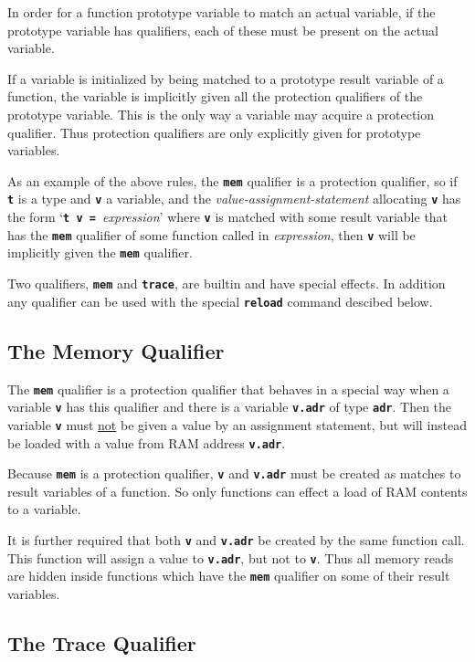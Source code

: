 \documentclass[12pt]{article}
\makeatletter
\newcommand{\TT}[1]{{\tt \bfseries #1}}
\newcommand{\ttkey}[1]{\TT{#1}\index{#1@{\tt #1}}}
\makeatother
\begin{document}
In order for a function
prototype variable to match an actual variable, if the prototype
variable has qualifiers, each of these must be present on the
actual variable.

If a variable is initialized by being matched to a prototype result variable
of a function, the variable is implicitly given all the protection qualifiers
of the prototype variable.  This is the only way a variable may acquire
a protection qualifier.  Thus protection qualifiers are only explicitly
given for prototype variables.

As an example of the above rules, the \TT{mem} qualifier is
a protection qualifier, so if \TT{t} is a type and \TT{v} a
variable, and the {\em value-assignment-statement} allocating \TT{v} has the
form `\TT{t v = }{\em expression}' where \TT{v} is matched
with some result variable that has the \TT{mem} qualifier of some
function called in {\em expression}, then \TT{v} will be implicitly
given the \TT{mem} qualifier.

Two qualifiers, \TT{mem} and \TT{trace}, are builtin and have special
effects.  In addition any qualifier can be used with the special
\TT{reload} command descibed below.

\subsection{The Memory Qualifier}
\label{THE-MEM-QUALIFIER}

The \ttkey{mem} qualifier is a protection qualifier that behaves
in a special way when a variable \TT{v} has this qualifier and
there is a variable \TT{v.adr} of type \TT{adr}.  Then the
variable \TT{v} must \underline{not} be given a value by an
assignment statement, but will instead be loaded with a value
from RAM address \TT{v.adr}.

Because \TT{mem} is a protection qualifier, \TT{v} and \TT{v.adr}
must be created as matches to result variables of a function.
So only functions can effect a load of RAM contents to a variable.

It is further required that both \TT{v} and \TT{v.adr} be created
by the same function call.  This function will assign a value to
\TT{v.adr}, but not to \TT{v}.  Thus all memory reads are hidden
inside functions which have the \TT{mem} qualifier on some of
their result variables.


\subsection{The Trace Qualifier}
\label{THE-TRACE-QUALIFIER}
\end{document}
